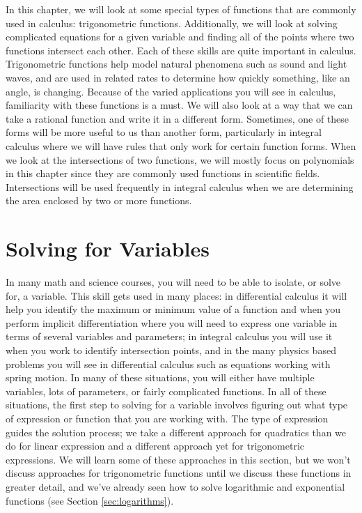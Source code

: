 In this chapter, we will look at some special types of functions that are commonly used in calculus: trigonometric functions. Additionally, we will look at solving complicated equations for a given variable and finding all of the points where two functions intersect each other. Each of these skills are quite important in calculus. Trigonometric functions help model natural phenomena such as sound and light waves, and are used in related rates to determine how quickly something, like an angle, is changing. Because of the varied applications you will see in calculus, familiarity with these functions is a must. We will also look at a way that we can take a rational function and write it in a different form. Sometimes, one of these forms will be more useful to us than another form, particularly in integral calculus where we will have rules that only work for certain function forms. When we look at the intersections of two functions, we will mostly focus on polynomials in this chapter since they are commonly used functions in scientific fields. Intersections will be used frequently in integral calculus when we are determining the area enclosed by two or more functions.

\section{Solving for Variables}\label{sec:solving_for_variables}


In many math and science courses, you will need to be able to isolate, or solve for, a variable. This skill gets used in many places: in differential calculus it will help you identify the maximum or minimum value of a function and when you perform implicit differentiation where you will need to express one variable in terms of several variables and parameters; in integral calculus you will use it when you work to identify intersection points, and in the many physics based problems you will see in differential calculus such as equations working with spring motion. In many of these situations, you will either have multiple variables, lots of parameters, or fairly complicated functions. In all of these situations, the first step to solving for a variable involves figuring out what type of expression or function that you are working with. The type of expression guides the solution process; we take a different approach for quadratics than we do for linear expression and a different approach yet for trigonometric expressions. We will learn some of these approaches in this section, but we won't discuss approaches for trigonometric functions until we discuss these functions in greater detail, and we've already seen how to solve logarithmic and exponential functions (see Section \ref{sec:logarithms}).

